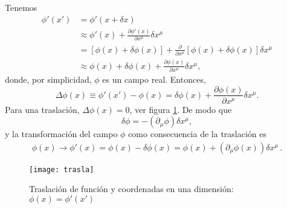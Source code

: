 Tenemos
\begin{align}
  \phi'(x')&=\phi'(x+\delta x)\\
  &\approx\phi'(x)+\frac{\partial\phi'(x)}{\partial x^\mu}\delta x^\mu\\
  &=[\phi(x)+\delta\phi(x)]+\frac{\partial}{\partial x^\mu}[\phi(x)+\delta\phi(x)]\delta x^\mu\\
  &\approx\phi(x)+\delta\phi(x)+\frac{\partial\phi(x)}{\partial x^\mu}\delta x^\mu,
\end{align}
donde, por simplicidad, $\phi$ es un campo real. Entonces,
\begin{equation}
  \label{eq:Deltaf}
  \Delta\phi(x)\equiv\phi'(x')-\phi(x)=\delta\phi(x)+\frac{\partial\phi(x)}{\partial x^\mu}\delta x^\mu.
\end{equation}
Para una traslaci\'on, $\Delta\phi(x)=0$, ver figura 
\ref{fig:trasla}. %
De modo que
\begin{equation}
  \label{eq:dmuxmu}
  \delta\phi=-(\partial_\mu\phi)\delta x^\mu,
\end{equation}
y la transformaci\'on del campo $\phi$ como consecuencia de la traslaci\'on es
\begin{align}
  \phi(x)\to\phi'(x)=\phi(x)-\delta\phi(x)=\phi(x)+(\partial_\mu\phi(x))\delta x^\mu\,.
\end{align}

\begin{figure} %
  \centering %
  \texttt{[image: trasla]} %
  \caption{Traslaci\'on de funci\'on y coordenadas en una dimensi\'on: $\phi(x)=\phi'(x')$ } %
  \label{fig:trasla} %
\end{figure} %





